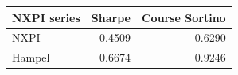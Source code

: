 \begin{tabular}{lrr}
\toprule
NXPI series & Sharpe & Course Sortino \\
\midrule
NXPI & 0.4509 & 0.6290 \\
Hampel & 0.6674 & 0.9246 \\
\bottomrule
\end{tabular}
